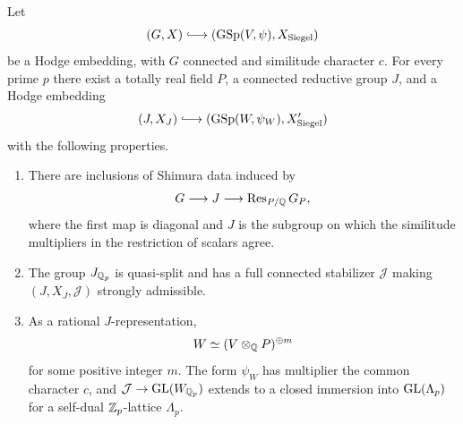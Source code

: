 \begin{lemma}
\label{lem:auxiliary-datum}
Let
\[
 (G,X)\lhook\joinrel\longrightarrow
 (\GSp(V,\psi),X_{\mathrm{Siegel}})
\]
be a Hodge embedding, with $G$ connected and similitude character $c$.
For every prime $p$ there exist a totally real field $P$, a connected
reductive group $J$, and a Hodge embedding
\[
 (J,X_J)\lhook\joinrel\longrightarrow
 (\GSp(W,\psi_W),X'_{\mathrm{Siegel}})
\]
with the following properties.
\begin{enumerate}
\item There are inclusions of Shimura data induced by
\[
 G\longrightarrow J\longrightarrow\operatorname{Res}_{P/\mathbb Q}G_P,
\]
where the first map is diagonal and $J$ is the subgroup on which the
similitude multipliers in the restriction of scalars agree.
\item The group $J_{\mathbb Q_p}$ is quasi-split and has a full connected
stabilizer $\mathcal J$ making $(J,X_J,\mathcal J)$ strongly admissible.
\item As a rational $J$-representation,
\begin{equation}
 W\simeq (V\otimes_{\mathbb Q}P)^{\oplus m}
 \label{eq:transport-copies}
\end{equation}
for some positive integer $m$.  The form $\psi_W$ has multiplier the
common character $c$, and $\mathcal J\to\operatorname{GL}(W_{\mathbb Q_p})$ extends to a
closed immersion into $\operatorname{GL}(\Lambda_p)$ for a self-dual $\mathbb Z_p$-lattice
$\Lambda_p$.
\end{enumerate}
\end{lemma}


